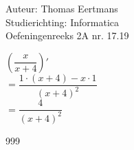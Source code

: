 \documentclass[a4paper]{article}
\begin{document}
  
\noindent \large Auteur: Thomas Eertmans \\
\noindent \large Studierichting: Informatica\\
\noindent \large Oefeningenreeks 2A nr. 17.19\\

\medskip

\normalsize

$\left(\dfrac{x}{x+4}\right)'$ \\

$= \dfrac{1 \cdot (x+4) - x \cdot 1}{(x+4)^2}$ \\

$= \dfrac{4}{(x+4)^2}$

\begin{thebibliography}{999}
\end{thebibliography}
\end{document}
